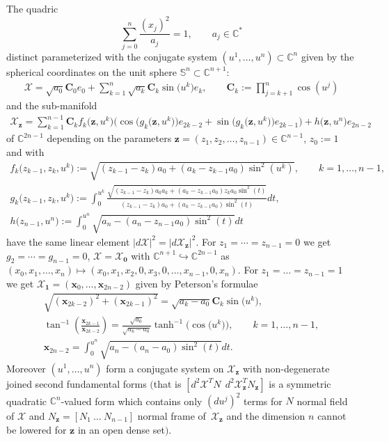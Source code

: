 \documentclass[pdftex]{sigma}
\begin{document}
\begin{theorem}\label{theorem1}
The quadric
\[
\sum_{j=0}^n\frac{(x_j)^2}{a_j}=1,\qquad
a_j\in\mathbb{C}^*
\] distinct parameterized with the conjugate
system $(u^1,\dots ,u^n)\subset\mathbb{C}^n$ given by the spherical
coordinates on the unit sphere
$\mathbb{S}^n\subset\mathbb{C}^{n+1}$:
\begin{gather*}
\mathcal{X}=\sqrt{a_0}\mathbf{C}_0e_0+
\sum_{k=1}^n\sqrt{a_k}\mathbf{C}_k\sin\big(u^k\big)e_k,\qquad
\mathbf{C}_k:=\prod_{j=k+1}^n\cos(u^j)
\end{gather*}
and the sub-manifold
\begin{gather*}
\mathcal{X}_{\mathbf{z}}=\sum_{k=1}^{n-1}\mathbf{C}_kf_k\big(\mathbf{z},u^k\big)
\big(\cos\big(g_k\big(\mathbf{z},u^k\big)\big)e_{2k-2}
+\sin\big(g_k\big(\mathbf{z},u^k\big)\big)e_{2k-1}\big)+h\big(\mathbf{z},u^n\big)e_{2n-2}
\end{gather*}
 of
$\mathbb{C}^{2n-1}$ depending on the parameters
$\mathbf{z}=(z_1,z_2,\dots ,z_{n-1})\in\mathbb{C}^{n-1}$, $z_0:=1$
and with
\begin{gather}
f_k\big(z_{k-1},z_k,u^k\big):=\sqrt{(z_{k-1}-z_k)a_0+(a_k-z_{k-1}a_0)\sin^2(u^k)},\qquad k=1,\dots ,n-1,\nonumber\\
g_k\big(z_{k-1},z_k,u^k\big):=\int_0^{u^k}\frac{\sqrt{(z_{k-1}-z_k)a_0a_k+(a_k-z_{k-1}a_0)z_ka_0\sin^2(t)}}
{(z_{k-1}-z_k)a_0+(a_k-z_{k-1}a_0)\sin^2(t)}dt,\nonumber\\
h\big(z_{n-1},u^n\big):=\int_0^{u^n}\sqrt{a_n-(a_n-z_{n-1}a_0)\sin^2(t)}dt\label{eq:fgn}
\end{gather}
have the same linear element
$|d\mathcal{X}|^2{=}|d\mathcal{X}_{\mathbf{z}}|^2$. For
$z_1={\cdots}=z_{n-1}=0$ we get \mbox{$g_2={\cdots}=g_{n-1}=0$},
$\mathcal{X}=\mathcal{X}_{\mathbf{0}}$ with
$\mathbb{C}^{n+1}\hookrightarrow\mathbb{C}^{2n-1}$ as
$(x_0,x_1,\dots ,x_n)\mapsto(x_0,x_1,x_2,0,x_3,0,\dots ,x_{n-1},0,x_n)$.
For $z_1=\dots =z_{n-1}=1$ we get
$\mathcal{X}_{\mathbf{1}}=(\mathbf{x}_0,\dots ,\mathbf{x}_{2n-2})$
given by Peterson's formulae
\begin{gather}
\sqrt{(\mathbf{x}_{2k-2})^2+(\mathbf{x}_{2k-1})^2}=\sqrt{a_k-a_0}\mathbf{C}_k\sin\big(u^k\big),\nonumber\\
 \tan^{-1}\left(\frac{\mathbf{x}_{2k-1}}{\mathbf{x}_{2k-2}}\right)
=\frac{\sqrt{a_0}}{\sqrt{a_k-a_0}}\tanh^{-1}\big(\cos\big(u^k\big)\big), \qquad k=1,\dots,n-1,
\nonumber\\
\mathbf{x}_{2n-2}=\int_0^{u^n}\sqrt{a_n-(a_n-a_0)\sin^2(t)}dt.\label{eq:pfn}
\end{gather}
Moreover $(u^1,\dots ,u^n)$ form a conjugate system on
$\mathcal{X}_{\mathbf{z}}$ with non-degenerate joined second
fundamental forms $($that is $[d^2\mathcal{X}^TN\ \
d^2\mathcal{X}_{\mathbf{z}}^TN_{\mathbf{z}}]$ is a symmetric
quadratic $\mathbb{C}^n$-valued form which contains only
$(du^j)^2$ terms for $N$ normal field of $\mathcal{X}$ and
$N_{\mathbf{z}}=[N_1\   \dots   \ N_{n-1}]$ normal frame of~$\mathcal{X}_{\mathbf{z}}$ and the dimension $n$ cannot be lowered
for $\mathbf{z}$ in an open dense set$)$.
\end{theorem}
\end{document}
